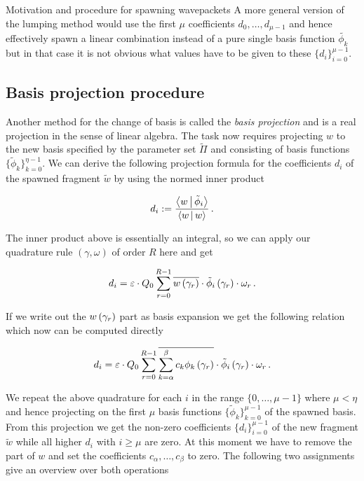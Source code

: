 \begin{chapter}{Motivation and procedure for spawning wavepackets}
A more general version of the lumping method would use the first $\mu$ coefficients
$d_0, \ldots, d_{\mu-1}$ and hence effectively spawn a linear combination instead of
a pure single basis function $\tilde{\phi_k}$ but in that case it is not obvious
what values have to be given to these $\{d_i\}_{i=0}^{\mu-1}$.

\subsection{Basis projection procedure}

Another method for the change of basis is called the \emph{basis projection} and is
a real projection in the sense of linear algebra. The task now requires projecting $w$
to the new basis specified by the parameter set $\tilde{\Pi}$ and consisting of
basis functions $\{\tilde{\phi}_k\}_{k=0}^{\eta-1}$. We can derive the following
projection formula for the coefficients $d_i$ of the spawned fragment $\tilde{w}$ by
using the normed inner product

\begin{equation} \label{eq:basis_projection}
  d_i := \frac{\Braket{w|\tilde{\phi}_i}}{\Braket{w|w}} \,.
\end{equation}

The inner product above is essentially an integral, so we can apply our quadrature
rule $\left(\gamma, \omega\right)$ of order $R$ here and get

\begin{equation} \label{eq:projection_quadrature}
  d_i = \varepsilon \cdot Q_0 \sum_{r=0}^{R-1} \overline{w\left( \gamma_r \right)} \cdot \tilde{\phi}_i \left( \gamma_r \right) \cdot \omega_r \,.
\end{equation}

If we write out the $w\left( \gamma_r \right)$ part as basis expansion we get the following
relation which now can be computed directly

\begin{equation} \label{eq:projection_quadrature_full}
  d_i = \varepsilon \cdot Q_0 \sum_{r=0}^{R-1} \overline{\sum_{k=\alpha}^\beta c_k \phi_k\left( \gamma_r \right)} \cdot \tilde{\phi}_i \left( \gamma_r \right) \cdot \omega_r \,.
\end{equation}

We repeat the above quadrature for each $i$ in the range $\{0, \ldots, \mu-1\}$
where $\mu < \eta$ and hence projecting on the first $\mu$ basis functions
$\{\tilde{\phi}_k\}_{k=0}^{\mu-1}$ of the spawned basis. From this projection we
get the non-zero coefficients $\{d_i\}_{i=0}^{\mu-1}$ of the new fragment $\tilde{w}$
while all higher $d_i$ with $i \geq \mu$ are zero. At this moment we have to
remove the part of $w$ and set the coefficients $c_\alpha, \ldots, c_\beta$
to zero. The following two assignments give an overview over both operations


\end{chapter}
